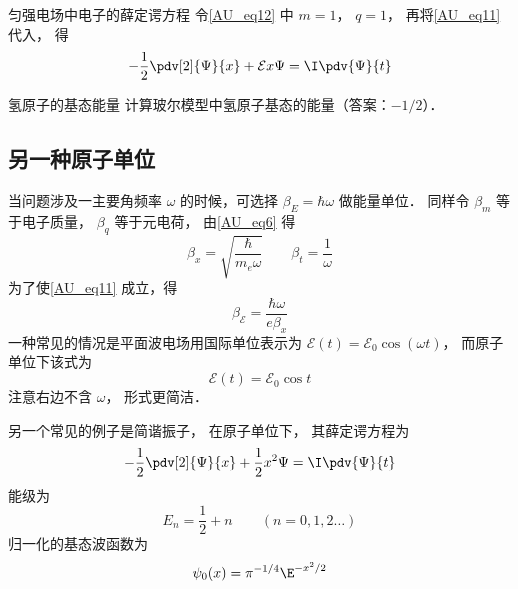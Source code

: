 \begin{example}{匀强电场中电子的薛定谔方程}
令\autoref{AU_eq12} 中 $m = 1$， $q = 1$， 再将\autoref{AU_eq11} 代入， 得
\begin{equation}
-\frac12 \pdv[2]{\Psi}{x} + \mathcal{E} x \Psi= \I\pdv{\Psi}{t}
\end{equation}
\end{example}

\begin{exercise}{氢原子的基态能量}
计算玻尔模型中氢原子基态的能量（答案：$-1/2$）．
\end{exercise}

\subsection{另一种原子单位}

当问题涉及一主要角频率 $\omega$ 的时候，可选择 $\beta_E = \hbar\omega$ 做能量单位． 同样令 $\beta_m$ 等于电子质量， $\beta_q$ 等于元电荷， 由\autoref{AU_eq6} 得
\begin{equation}\label{AU_eq15}
\beta_x = \sqrt{\frac{\hbar}{m_e\omega}}
\qquad
\beta_t = \frac{1}{\omega}
\end{equation}
为了使\autoref{AU_eq11} 成立，得
\begin{equation}
\beta_\mathcal{E} = \frac{\hbar\omega}{e \beta_x}
\end{equation}
一种常见的情况是平面波电场用国际单位表示为 $\mathcal{E}(t) = \mathcal{E}_0\cos(\omega t)$， 而原子单位下该式为
\begin{equation}
\mathcal{E}(t) = \mathcal{E}_0\cos t
\end{equation}
注意右边不含 $\omega$， 形式更简洁．

另一个常见的例子是简谐振子， 在原子单位下， 其薛定谔方程为
\begin{equation}\label{AU_eq18}
-\frac12 \pdv[2]{\Psi}{x} + \frac12 x^2 \Psi= \I\pdv{\Psi}{t}
\end{equation}
能级为
\begin{equation}\label{AU_eq19}
E_n = \frac12 + n \qquad (n = 0, 1, 2\dots)
\end{equation}
归一化的基态波函数为
\begin{equation}
\psi_0(x) = \pi^{-1/4} \E^{-x^2/2}
\end{equation}


